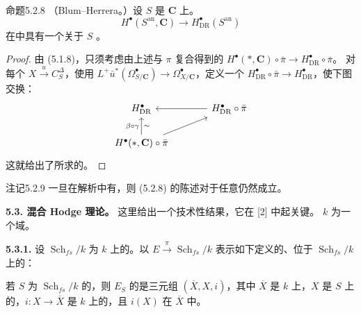 \begin{SGAresult}{命题}{5.2.8}
（Blum--Herrera。）设 $S$ 是 $\mathbf C$ 上。
\[
H^\bullet(S^{\mathrm{an}},\mathbf C)\longrightarrow H_{\mathrm{DR}}^\bullet(S^{\mathrm{an}})
\]
在中具有一个关于 $S$ 。
\end{SGAresult}
\begin{proof}
由 (5.1.8)，只须考虑由上述与 $\pi$ 复合得到的
$H^\bullet(*,\mathbf C)\circ\bar\pi\to H_{\mathrm{DR}}^\bullet\circ\bar\pi$。
对每个 $X\xrightarrow{u}C_S^\Delta$，使用 $L^+\bar u^*(\Omega_{S/\mathbf C}^\bullet)\to\Omega_{X/\mathbf C}^\bullet$，定义一个 $H_{\mathrm{DR}}^\bullet\circ\bar\pi\to H_{\mathrm{DR}}^\bullet$，使下图交换：
\[
\begin{tikzcd}[column sep=large]
H_{\mathrm{DR}}^\bullet&H_{\mathrm{DR}}^\bullet\circ\bar\pi\arrow[l]\\
H^\bullet(*,\mathbf C)\circ\bar\pi\arrow[u,"\beta\circ\gamma","\sim"']\arrow[ur]&
\end{tikzcd}
\]
这就给出了所求的。
\end{proof}
\begin{SGAresult}{注记}{5.2.9}
一旦在解析中有，则 (5.2.8) 的陈述对于任意仍然成立。
\end{SGAresult}

\textbf{5.3. 混合 Hodge 理论。} 这里给出一个技术性结果，它在 [2] 中起关键。
$k$ 为一个域。

\textbf{5.3.1.} 设 $\operatorname{Sch}_{fs}/k$ 为 $k$ 上的。以 $E\xrightarrow{\pi}\operatorname{Sch}_{fs}/k$ 表示如下定义的、位于 $\operatorname{Sch}_{fs}/k$ 上的：

若 $S$ 为 $\operatorname{Sch}_{fs}/k$ 的，则 $E_S$ 的是三元组 $(\overline X,X,i)$，其中 $\overline X$ 是 $k$ 上，$X$ 是 $S$ 上的，$i:X\to\overline X$ 是 $k$ 上的，且 $i(X)$ 在 $\overline X$ 中。

